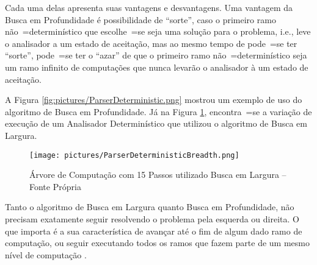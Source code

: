 {    Cada uma delas apresenta suas vantagens e
    desvantagens.
    Uma vantagem da Busca em Profundidade é possibilidade de ``sorte'',
    caso o primeiro ramo não~=determinístico que escolhe~=se seja uma solução para o problema,
    i.e.,
    leve o analisador a um estado de aceitação,
    mas ao mesmo tempo de pode~=se ter ``sorte'',
    pode~=se ter o ``azar'' de que o primeiro ramo não~=determinístico seja um ramo infinito de computações que nunca levarão o analisador à um estado de aceitação.

    A Figura \ref{fig:pictures/ParserDeterministic.png} mostrou um exemplo de uso do algoritmo de Busca em Profundidade.
    Já na Figura \ref{fig:pictures/ParserDeterministicBreadth.png},
    encontra~=se a variação de execução de um Analisador Determinístico que utilizou o algoritmo de Busca em Largura.
    \begin{figure}[h]
    \centering
    \texttt{[image: pictures/ParserDeterministicBreadth.png]}
    \caption[Árvore de Computação com 15 Passos utilizado Busca em Largura]{Árvore de Computação com 15 Passos utilizado Busca em Largura -- Fonte Própria}
    \label{fig:pictures/ParserDeterministicBreadth.png}
    \end{figure}

    Tanto o algoritmo de Busca em Largura quanto Busca em Profundidade,
    não precisam exatamente seguir resolvendo o problema pela esquerda ou
    direita.
    O que importa é a sua característica de avançar até o fim de algum dado ramo de computação,
    ou seguir executando todos os ramos que fazem parte de um mesmo nível de computação \cite{cormenIntroductionToAlgorithms,efficientBreadthFirstSearch}.
}

